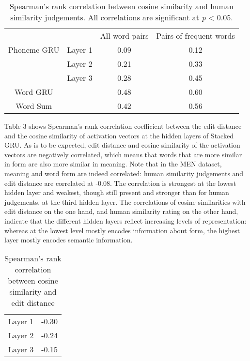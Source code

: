 \begin{table}[]
	\centering
	\begin{tabular}{cccc}
		&& All word pairs & Pairs of frequent words \\
		{\sc Phoneme GRU} & Layer 1 & 0.09 & 0.12\\
		& Layer 2 & 0.21 & 0.33 \\
		& Layer 3 & 0.28 & 0.45 \\
		\hline
		{\sc Word GRU} & & 0.48 & 0.60\\
		\hline
		{\sc Word Sum} & & 0.42 & 0.56
	\end{tabular}
	\caption{Spearman's rank correlation between cosine similarity and human similarity judgements. All correlations are significant at \textit{p} < 0.05.} %
\end{table}

Table 3 shows Spearman's rank correlation coefficient between the edit distance and the cosine similarity of activation vectors at the hidden layers of {\sc Stacked GRU}.
As is to be expected, edit distance and cosine similarity of the activation vectors are negatively correlated, which means that words that are more similar in form are also more similar in meaning. Note that in the MEN dataset, meaning and word form are indeed correlated: human similarity judgements and edit distance are correlated at -0.08. The correlation is strongest at the lowest hidden layer and weakest, though still present and stronger than for human judgements, at the third hidden layer. 
The correlations of cosine similarities with edit distance on the one hand, and human similarity rating on the other hand, indicate that the different hidden layers reflect increasing levels of representation: whereas at the lowest level mostly encodes information about form, the highest layer mostly encodes semantic information.

\begin{table}[]
	\centering
	\begin{tabular}{cc}
		Layer 1 & -0.30 \\
		Layer 2 & -0.24 \\
		Layer 3 & -0.15
	\end{tabular}
	\caption{Spearman's rank correlation between cosine similarity and edit distance} %
\end{table}

